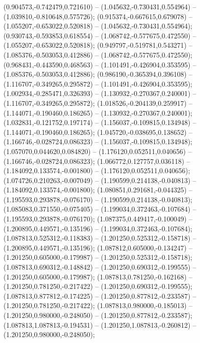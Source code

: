  (0.904573,-0.742479,0.721610) -- (1.045632,-0.730431,0.554964) -- (1.039810,-0.810648,0.575726);
 (0.915374,-0.667615,0.679078) -- (1.055207,-0.653022,0.520818) -- (1.045632,-0.730431,0.554964);
 (0.930743,-0.593853,0.618554) -- (1.068742,-0.577675,0.472550) -- (1.055207,-0.653022,0.520818);
 (0.949797,-0.519781,0.543271) -- (1.085376,-0.503053,0.412886) -- (1.068742,-0.577675,0.472550);
 (0.968431,-0.443590,0.468563) -- (1.101491,-0.426904,0.353595) -- (1.085376,-0.503053,0.412886);
 (0.986190,-0.365394,0.396108) -- (1.116707,-0.349265,0.295872) -- (1.101491,-0.426904,0.353595);
 (1.002934,-0.285471,0.326393) -- (1.130932,-0.270367,0.240001) -- (1.116707,-0.349265,0.295872);
 (1.018526,-0.204139,0.259917) -- (1.144071,-0.190460,0.186265) -- (1.130932,-0.270367,0.240001);
 (1.032831,-0.121752,0.197174) -- (1.156037,-0.109815,0.134948) -- (1.144071,-0.190460,0.186265);
 (1.045720,-0.038695,0.138652) -- (1.166746,-0.028724,0.086323) -- (1.156037,-0.109815,0.134948);
 (1.057070,0.044620,0.084820) -- (1.176120,0.052511,0.040656) -- (1.166746,-0.028724,0.086323);
 (1.066772,0.127757,0.036118) -- (1.184092,0.133574,-0.001800) -- (1.176120,0.052511,0.040656);
 (1.074726,0.210263,-0.007049) -- (1.190599,0.214138,-0.040813) -- (1.184092,0.133574,-0.001800);
 (1.080851,0.291681,-0.044325) -- (1.195593,0.293878,-0.076170) -- (1.190599,0.214138,-0.040813);
 (1.085083,0.371550,-0.075405) -- (1.199034,0.372463,-0.107684) -- (1.195593,0.293878,-0.076170);
 (1.087375,0.449417,-0.100049) -- (1.200895,0.449571,-0.135196) -- (1.199034,0.372463,-0.107684);
 (1.087813,0.525312,-0.118383) -- (1.201250,0.525312,-0.158718) -- (1.200895,0.449571,-0.135196);
 (1.087812,0.605000,-0.134247) -- (1.201250,0.605000,-0.179987) -- (1.201250,0.525312,-0.158718);
 (1.087813,0.690312,-0.148842) -- (1.201250,0.690312,-0.199555) -- (1.201250,0.605000,-0.179987);
 (1.087813,0.781250,-0.162168) -- (1.201250,0.781250,-0.217422) -- (1.201250,0.690312,-0.199555);
 (1.087813,0.877812,-0.174225) -- (1.201250,0.877812,-0.233587) -- (1.201250,0.781250,-0.217422);
 (1.087813,0.980000,-0.185013) -- (1.201250,0.980000,-0.248050) -- (1.201250,0.877812,-0.233587);
 (1.087813,1.087813,-0.194531) -- (1.201250,1.087813,-0.260812) -- (1.201250,0.980000,-0.248050);
